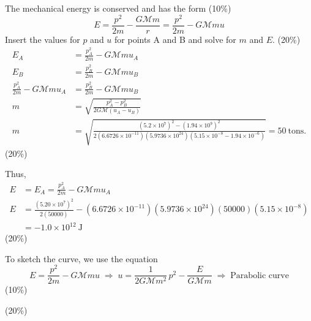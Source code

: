 The mechanical energy is conserved and has the form \hfill(10\%)
\[
  E = \frac{p^2}{2m} - \frac{G\mathcal{M}m}{r} = \frac{p^2}{2m} - G\mathcal{M}mu
\]
Insert the values for $p$ and $u$ for points A and B and solve for $m$ and $E$.
\hfill(20\%)
\begin{align*}
  E_A &= \frac{p_A^2}{2m} - G\mathcal{M}mu_A \\
  E_B &= \frac{p_B^2}{2m} - G\mathcal{M}mu_B \\
  \frac{p_A^2}{2m} - G\mathcal{M}mu_A &= \frac{p_B^2}{2m} - G\mathcal{M}mu_B \\
  m &= \sqrt{\frac{p_A^2 - p_B^2}{2G\mathcal{M}(u_A - u_B)}} \\
  m &= \sqrt{\frac{(5.2\times 10^{7})^2 - (1.94\times 10^{9})^2}
       {2(6.6726\times 10^{-11})(5.9736\times 10^{24})
        (5.15\times 10^{-8} - 1.94\times 10^{-6})}}
     = 50\ \text{tons.}
\end{align*}
\hfill(20\%)

Thus,
\begin{align*}
  E &= E_A = \frac{p_A^2}{2m} - G\mathcal{M}mu_A \\
  E &= \frac{(5.20\times 10^{7})^2}{2(50000)}
      - (6.6726\times 10^{-11})(5.9736\times 10^{24})(50000)
        (5.15\times 10^{-8}) \\
  &= -1.0\times 10^{12}\ \text{J}
\end{align*}
\hfill(20\%)

To sketch the curve, we use the equation
\[
  E = \frac{p^2}{2m} - G\mathcal{M}mu
  \;\Longrightarrow\;
  u = \frac{1}{2G\mathcal{M}m^2}\,p^2 - \frac{E}{G\mathcal{M}m}
  \;\Longrightarrow\;
  \text{Parabolic curve}
\]
\hfill(10\%)

\hfill(20\%)
